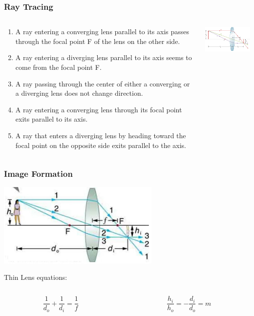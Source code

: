 \documentclass{beamer}
\begin{document}
\begin{frame}\frametitle{Ray Tracing}
\begin{columns}
\begin{column}{7.4cm}
\begin{enumerate}
\item A ray entering a converging lens parallel to its axis passes through the focal point F of the lens on the other side.
\item A ray entering a diverging lens parallel to its axis seems to come from the focal point F.
\item A ray passing through the center of either a converging or a diverging lens does not change direction.
\item A ray entering a converging lens through its focal point exits parallel to its axis.
\item A ray that enters a diverging lens by heading toward the focal point on the opposite side exits parallel to the axis.
\end{enumerate}


\end{column}
\begin{column}{4.6cm}
\begin{center}
\includegraphics[width=4.5cm]{fig/raytrace.jpg}
\end{center}
\end{column}
\end{columns}
\end{frame}


\begin{frame}\frametitle{Image Formation}

\begin{center}
\includegraphics[width=8cm]{fig/imageform1.jpg}
\end{center}


Thin Lens equations:

\begin{columns}
\begin{column}{5.5cm}
\[ \frac{1}{d_o} + \frac{1}{d_i} = \frac{1}{f}\]
\end{column}
\begin{column}{5.5cm}
\[ \frac{h_i}{h_o} = -\frac{d_i}{d_o} = m\]
\end{column}
\end{columns}

\end{frame}
\end{document}
